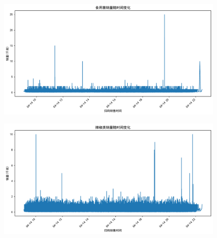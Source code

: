 \documentclass{cumcmthesis} %
\begin{document}
\begin{figure}[H]
    \begin{minipage}[c]{0.45\textwidth}
        \centering
        \includegraphics[width=\textwidth]{fig/食用菌_sales.pdf}
        \label{fig:sample-figure-c}
    \end{minipage}
    \hfill
    \begin{minipage}[c]{0.45\textwidth}
        \centering
        \includegraphics[width=\textwidth]{fig/辣椒_sales.pdf}
        \label{fig:sample-figure-d}
    \end{minipage}
    \vspace{1em} %
    

\end{figure}
\end{document}

